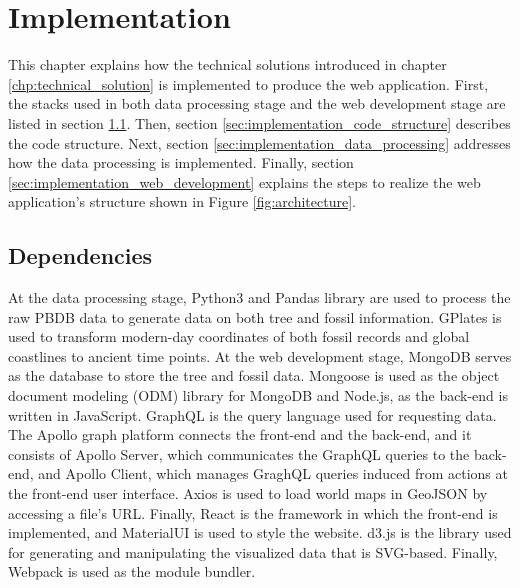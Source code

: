 \documentclass[11pt, a4paper,oneside,chapterprefix=false]{scrbook}
\begin{document}
\chapter{Implementation} \label{chp:implementation}
This chapter explains how the technical solutions introduced in chapter \ref{chp:technical_solution} is implemented to produce the web application. First, the stacks used in both data processing stage and the web development stage are listed in section \ref{sec:implementation_dependencies}. Then, section \ref{sec:implementation_code_structure} describes the code structure. Next, section \ref{sec:implementation_data_processing} addresses how the data processing is implemented. Finally, section \ref{sec:implementation_web_development} explains the steps to realize the web application's structure shown in Figure \ref{fig:architecture}.
\section{Dependencies} \label{sec:implementation_dependencies}
At the data processing stage, Python3 and Pandas library are used to process the raw PBDB data to generate data on both tree and fossil information. GPlates is used to transform modern-day coordinates of both fossil records and global coastlines to ancient time points. At the web development stage, MongoDB serves as the database to store the tree and fossil data. Mongoose is used as the object document modeling (ODM) library for MongoDB and Node.js, as the back-end is written in JavaScript. GraphQL is the query language used for requesting data. The Apollo graph platform connects the front-end and the back-end, and it consists of Apollo Server, which communicates the GraphQL queries to the back-end, and Apollo Client, which manages GraghQL queries induced from actions at the front-end user interface. Axios is used to load world maps in GeoJSON by accessing a file's URL. Finally, React is the framework in which the front-end is implemented, and MaterialUI is used to style the website. d3.js is the library used for generating and manipulating the visualized data that is SVG-based. Finally, Webpack is used as the module bundler.
\end{document}
